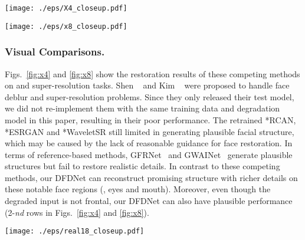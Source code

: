 \documentclass[runningheads]{llncs}
\begin{document}
\begin{figure*}[t]
	\setlength{\abovecaptionskip}{3pt}
	\setlength{\belowcaptionskip}{-16pt}
	\centering
	\texttt{[image: ./eps/X4\_closeup.pdf]}
	\caption{{Visual comparisons of these competing methods on  SR task. Close-up in the right bottom of GFRNet is the required guidance.}}
	\label{fig:x4}
\end{figure*}

\begin{figure*}[t]
	\setlength{\abovecaptionskip}{3pt}
	\setlength{\belowcaptionskip}{-6pt}
	\centering
	\texttt{[image: ./eps/x8\_closeup.pdf]}
	\caption{{{Visual comparisons of these competing methods on  SR task. Close-up in the right bottom of GFRNet is the required guidance.}}}
	\label{fig:x8}
\end{figure*}

\subsubsection{Visual Comparisons.} Figs.~\ref{fig:x4} and \ref{fig:x8} show the restoration results of these competing methods on  and  super-resolution tasks. Shen \etal~\cite{shen2018deep} and Kim \etal~\cite{progressive_face_sr} were proposed to handle face deblur and super-resolution problems. Since they only released their test model, we did not re-implement them with the same training data and degradation model in this paper, resulting in their poor performance. The retrained *RCAN, *ESRGAN and *WaveletSR still limited in generating plausible facial structure, which may be caused by the lack of reasonable guidance for face restoration. In terms of reference-based methods, GFRNet~\cite{li2018learning} and GWAINet~\cite{dogan2019exemplar} generate plausible structures but fail to restore realistic details. In contrast to these competing methods, 
our DFDNet can reconstruct promising structure with richer details on these notable face regions (\ie, eyes and mouth). Moreover, even though the degraded input is not frontal, our DFDNet can also have plausible performance (2-\textit{nd} rows in Figs.~\ref{fig:x4} and \ref{fig:x8}).

\begin{figure*}[t]
\setlength{\belowcaptionskip}{-16pt}
	\centering
	\texttt{[image: ./eps/real18\_closeup.pdf]}
	\caption{{Visual comparisons of competing methods with top performance on real-world low-quality images. Close-up at the right bottom is the required guidance. }}
	\label{fig:real}
\end{figure*}
\end{document}
